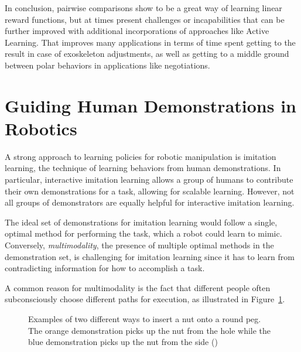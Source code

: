 \documentclass[
  letterpaper,
  numbers=noenddot,
  DIV=11,
  oneside]{scrreprt}
\theoremstyle{remark}
\begin{document}
In conclusion, pairwise comparisons show to be a great way of learning
linear reward functions, but at times present challenges or
incapabilities that can be further improved with additional
incorporations of approaches like Active Learning. That improves many
applications in terms of time spent getting to the result in case of
exoskeleton adjustments, as well as getting to a middle ground between
polar behaviors in applications like negotiations.

\section{Guiding Human Demonstrations in
Robotics}\label{guiding-human-demonstrations-in-robotics}

A strong approach to learning policies for robotic manipulation is
imitation learning, the technique of learning behaviors from human
demonstrations. In particular, interactive imitation learning allows a
group of humans to contribute their own demonstrations for a task,
allowing for scalable learning. However, not all groups of demonstrators
are equally helpful for interactive imitation learning.

The ideal set of demonstrations for imitation learning would follow a
single, optimal method for performing the task, which a robot could
learn to mimic. Conversely, \emph{multimodality}, the presence of
multiple optimal methods in the demonstration set, is challenging for
imitation learning since it has to learn from contradicting information
for how to accomplish a task.

A common reason for multimodality is the fact that different people
often subconsciously choose different paths for execution, as
illustrated in Figure~\ref{fig-multimodalexecution}.

\begin{figure}


\caption{\label{fig-multimodalexecution}Examples of two different ways
to insert a nut onto a round peg. The orange demonstration picks up the
nut from the hole while the blue demonstration picks up the nut from the
side ()}

\end{figure}%
\end{document}
